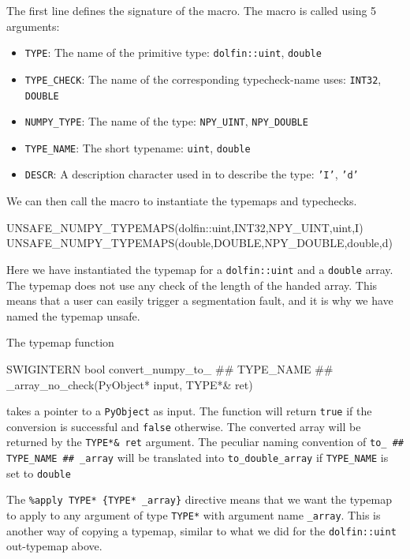 \begin{code}
\begin{code}
\end{code}
The first line defines the signature of the macro. The macro is called using 5 arguments:
\begin{itemize}
\item \texttt{TYPE}: The name of the primitive type: \texttt{dolfin::uint}, \texttt{double}
\item \texttt{TYPE\_CHECK}: The name of the corresponding typecheck-name \swig uses: \texttt{INT32}, \texttt{DOUBLE}
\item \texttt{NUMPY\_TYPE}: The name of the \numpy type: \texttt{NPY\_UINT}, \texttt{NPY\_DOUBLE}
\item \texttt{TYPE\_NAME}: The short typename: \texttt{uint}, \texttt{double}
\item \texttt{DESCR}: A description character used in \numpy to describe the type: \texttt{'I'}, \texttt{'d'}
\end{itemize}
We can then call the macro to instantiate the typemaps and typechecks.
\begin{code}
UNSAFE_NUMPY_TYPEMAPS(dolfin::uint,INT32,NPY_UINT,uint,I)
UNSAFE_NUMPY_TYPEMAPS(double,DOUBLE,NPY_DOUBLE,double,d)
\end{code}
Here we have instantiated the typemap for a \texttt{dolfin::uint} and a \texttt{double} array. The typemap does not use any check of the length of the handed \numpy array. This means that a user can easily trigger a segmentation fault, and it is why we have named the typemap unsafe.\par

The typemap function
\begin{code}
  SWIGINTERN bool convert_numpy_to_ ## TYPE_NAME ## _array_no_check(PyObject* input, TYPE*& ret)
\end{code}
takes a pointer to a \texttt{PyObject} as input. The function will return \texttt{true} if the conversion is successful and \texttt{false} otherwise. The converted array will be returned by the \texttt{TYPE*\& ret} argument. The peculiar naming convention of \texttt{to\_ \#\# TYPE\_NAME \#\# \_array} will be translated into \texttt{to\_double\_array} if \texttt{TYPE\_NAME} is set to \texttt{double}\par

The \texttt{\%apply TYPE* \{TYPE* \_array\}} directive means that we want the typemap to apply to any argument of type \texttt{TYPE*} with argument name \texttt{\_array}. This is another way of copying a typemap, similar to what we did for the \texttt{dolfin::uint} out-typemap above.\par


\end{code}
